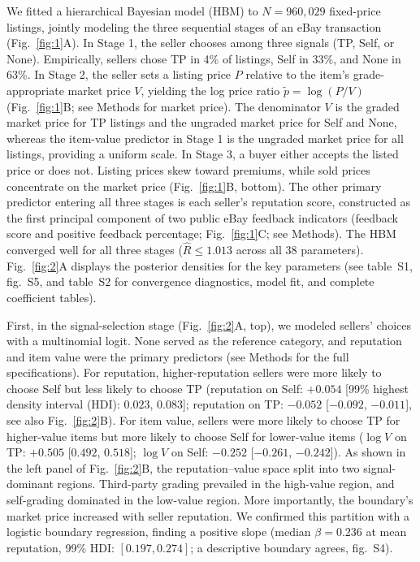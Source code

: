 \documentclass[11pt,letterpaper]{article}
\theoremstyle{definition}
\begin{document}
We fitted a hierarchical Bayesian model (HBM) to $N = 960{,}029$ fixed-price listings, jointly modeling the three sequential stages of an eBay transaction (Fig.~\ref{fig:1}A). In Stage 1, the seller chooses among three signals (TP, Self, or None). Empirically, sellers chose TP in 4\% of listings, Self in 33\%, and None in 63\%. In Stage 2, the seller sets a listing price $P$ relative to the item's grade-appropriate market price $V$, yielding the log price ratio $\tilde{p} = \log(P/V)$ (Fig.~\ref{fig:1}B; see Methods for market price). The denominator $V$ is the graded market price for TP listings and the ungraded market price for Self and None, whereas the item-value predictor in Stage 1 is the ungraded market price for all listings, providing a uniform scale. In Stage 3, a buyer either accepts the listed price or does not. Listing prices skew toward premiums, while sold prices concentrate on the market price (Fig.~\ref{fig:1}B, bottom). The other primary predictor entering all three stages is each seller's reputation score, constructed as the first principal component of two public eBay feedback indicators (feedback score and positive feedback percentage; Fig.~\ref{fig:1}C; see Methods). The HBM converged well for all three stages ($\hat{R} \leq 1.013$ across all 38 parameters). Fig.~\ref{fig:2}A displays the posterior densities for the key parameters (see table~S1, fig.~S5, and table~S2 for convergence diagnostics, model fit, and complete coefficient tables).

First, in the signal-selection stage (Fig.~\ref{fig:2}A, top), we modeled sellers' choices with a multinomial logit. None served as the reference category, and reputation and item value were the primary predictors (see Methods for the full specifications). For reputation, higher-reputation sellers were more likely to choose Self but less likely to choose TP (reputation on Self: $+0.054$ [99\% highest density interval (HDI): $0.023$, $0.083$]; reputation on TP: $-0.052$ [$-0.092$, $-0.011$], see also Fig.~\ref{fig:2}B). For item value, sellers were more likely to choose TP for higher-value items but more likely to choose Self for lower-value items ($\log V$ on TP: $+0.505$ [$0.492$, $0.518$]; $\log V$ on Self: $-0.252$ [$-0.261$, $-0.242$]). As shown in the left panel of Fig.~\ref{fig:2}B, the reputation--value space split into two signal-dominant regions. Third-party grading prevailed in the high-value region, and self-grading dominated in the low-value region. More importantly, the boundary's market price increased with seller reputation. We confirmed this partition with a logistic boundary regression, finding a positive slope (median $\beta = 0.236$ at mean reputation, 99\% HDI: $[0.197, 0.274]$; a descriptive boundary agrees, fig.~S4).
\end{document}
